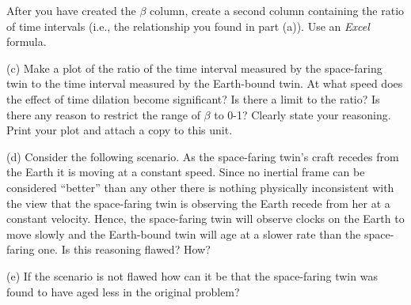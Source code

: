 After you have created the $\beta$ column, create a second
column containing the ratio of time intervals (i.e., the
relationship you found in part (a)).  Use an
\textit{Excel} formula.



(c) Make a plot of the ratio of the time interval measured by the
space-faring twin to the time interval measured by the Earth-bound
twin. At what 
speed does the effect of time dilation become significant? Is there
a limit to the ratio? Is there any reason to restrict the range of
\( \beta  \) to 0-1? Clearly state your reasoning. Print your plot
and attach a copy to this unit.
\answerspace{10mm}

(d) Consider the following scenario. As the space-faring twin's craft
recedes from the Earth it is moving at a constant speed. Since no
inertial frame can be considered {}``better'' than any other there
is nothing physically inconsistent with the view that the space-faring
twin is observing the Earth recede from her at a constant velocity.
Hence, the space-faring twin will observe clocks on the Earth to move
slowly and the Earth-bound twin will age at a slower rate than the
space-faring one. Is this reasoning flawed? How? 
\answerspace{15mm}

(e) If the scenario is not flawed how can it be that the space-faring
twin was found to have aged less in the original problem?
